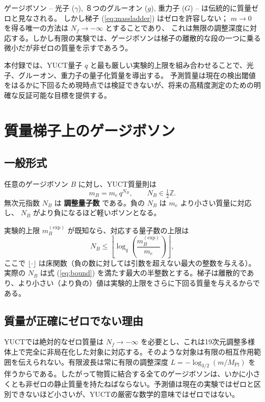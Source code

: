 \documentclass[11pt,a4paper]{article}
\newcommand{\Mpl}{M_{\mathrm{Pl}}}
\begin{document}
	ゲージボソン – 光子 ($\gamma$), ８つのグルーオン ($g$), 重力子 ($G$) – は伝統的に質量ゼロと見なされる。
	しかし梯子 (\ref{eq:massladder}) はゼロを許容しない； $m \to 0$ を得る唯一の方法は $N_f \to -\infty$ とすることであり、
	これは無限の調整深度に対応する。しかし有限の実験では、ゲージボソンは梯子の離散的な段の一つに乗る微小だが非ゼロの質量を示すであろう。
	
	本付録では、YUCT量子 $q$ と最も厳しい実験的上限を組み合わせることで、光子、グルーオン、重力子の量子化質量を導出する。
	予測質量は現在の検出閾値をはるかに下回るため現時点では検証できないが、将来の高精度測定のための明確な反証可能な目標を提供する。
	
	\section{質量梯子上のゲージボソン}
	
	\subsection{一般形式}
	
	任意のゲージボソン $B$ に対し、YUCT質量則は
	\begin{equation}\label{eq:bosonmass}
		m_B = m_e \, q^{N_B}, \qquad N_B \in \tfrac12\mathbb{Z}.
	\end{equation}
	無次元指数 $N_B$ は \textbf{調整量子数} である。負の $N_B$ は $m_e$ より小さい質量に対応し、 $N_B$ がより負になるほど軽いボソンとなる。
	
	実験的上限 $m_B^{\mathrm{(exp)}}$ が既知なら、対応する量子数の上限は
	\begin{equation}\label{eq:bound}
		N_B \le \left\lfloor \log_q\!\left( \frac{m_B^{\mathrm{(exp)}}}{m_e} \right) \right\rfloor ,
	\end{equation}
	ここで $\lfloor\cdot\rfloor$ は床関数（負の数に対しては引数を超えない最大の整数を与える）。実際の $N_B$ は式 (\ref{eq:bound}) を満たす最大の半整数とする。梯子は離散的であり、より小さい（より負の）値は実験的上限をさらに下回る質量を与えるからである。
	
	\subsection{質量が正確にゼロでない理由}
	
	YUCTでは絶対的なゼロ質量は $N_f \to -\infty$ を必要とし、これは19次元調整多様体上で完全に非局在化した対象に対応する。そのような対象は有限の相互作用範囲を伝えられない。有限波長は常に有限の調整深度 $L = -\log_{3/2}(m/\Mpl)$ を伴うからである。したがって物質に結合する全てのゲージボソンは、いかに小さくとも非ゼロの静止質量を持たねばならない。予測値は現在の実験ではゼロと区別できないほど小さいが、YUCTの厳密な数学的意味ではゼロではない。
	
\end{document}
